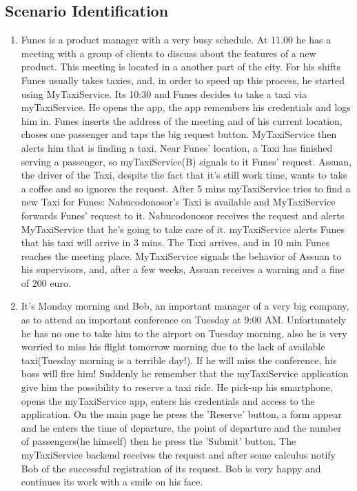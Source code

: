 \documentclass[11pt]{article} %
\begin{document}
  \subsection {Scenario Identification}
  \begin{enumerate}
        \item Funes is a product manager with a very busy schedule. At 11.00 he has a meeting
          with a group of clients to discuss about the features of a new product.
          This meeting is located in a another part of the city.
          For his shifts Funes usually takes taxies, and, in order to speed up this process, he
          started using MyTaxiService.
          Its 10:30 and Funes decides to take a taxi via myTaxiService. He opens the app,
          the app remembers his credentials and logs him in.
          Funes inserts the address of the meeting and of his current location, choses one passenger and taps
          the big request button. MyTaxiService then alerts him that is finding a taxi.
          Near Funes' location, a Taxi has finished serving a passenger, so myTaxiService(B) signals to it
          Funes' request. Assuan, the driver of the Taxi, despite the fact that it's still work time, wants to take a coffee
          and so ignores the request. After 5 mins myTaxiService tries to find a new Taxi
          for Funes: Nabucodonosor's Taxi is available and MyTaxiService forwards Funes' request to it.
          Nabucodonosor receives the request and alerts MyTaxiService that he's going to take care of it.
          myTaxiService alerts Funes that his taxi will arrive in 3 mins.
          The Taxi arrives, and in 10 min Funes reaches the meeting place. MyTaxiService
          signals the behavior of Assuan to his supervisors, and, after a few weeks, Assuan receives a warning and a fine of 200 euro.

        \item It's Monday morning and Bob, an important manager of a very big company, as to attend an important
           conference on Tuesday at 9:00 AM. Unfortunately he has no one
           to take him to the airport on Tuesday morning, also he is very worried to miss his flight tomorrow
           morning due to the lack of available taxi(Tuesday morning is a terrible day!).
           If he will miss the conference, his boss will fire him! Suddenly he remember that the myTaxiService
           application give him the possibility to reserve a taxi ride.
           He pick-up his smartphone, opens the myTaxiService app, enters his credentials and access to the application.
           On the main page he press the 'Reserve' button, a form appear and he enters the time of departure, the point of departure
           and the number of passengers(he himself) then he press the 'Submit' button. The myTaxiService backend receives the request
           and after some calculus notify Bob of the successful registration of its request. Bob is very happy and continues
           its work with a smile on his face.


\end{enumerate}
\end{document}
